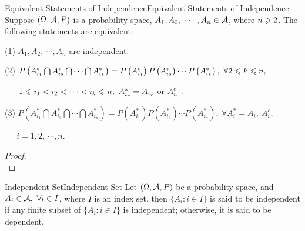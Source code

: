 \documentclass{elegantbook}
\begin{document}
\begin{theorem}{Equivalent Statements of Independence}{Equivalent Statements of Independence}
Suppose $(\Omega,\mathcal{A}, P)$ is a probability space, $A_1,A_2,\ \cdots,A_n\in\mathcal{A}$, where $n\geqslant2$. The following statements are equivalent:

(1) $A_1,A_2,\ \cdots,A_n$ are independent.

(2) $P\left(A_{i_1}^*\bigcap A_{i_2}^*\bigcap\cdots\bigcap A_{i_k}^*\right)=P\left(A_{i_1}^*\right) P\left(A_{i_2}^* \right)\cdots P\left(A_{i_k}^* \right),\ \forall 2\leqslant k\leqslant n,$

$\quad\ \ 1\leqslant i_1<i_2<\cdots <i_k\leqslant n,\ A_{i_r}^*=A_{i_r}$ or $A_{i_r}^c$ .
       
(3) $P\left(A_{i_1}^*\bigcap A_{i_2}^*\bigcap\cdots\bigcap A_{i_n}^*\right)=P\left(A_{i_1}^* \right)P\left(A_{i_2}^* \right)\cdots P\left(A_{i_n}^* \right),\ \forall A_i^*=A_i,\ A_i^c,$

$\quad\ \  i=1,2,\ \cdots,n$.

\end{theorem}

\begin{proof}
\\[4cm]\vspace{0.01cm}
\end{proof}

\begin{definition}{Independent Set}{Independent Set}
Let $(\Omega,\mathcal{A}, P)$ be a probability space, and $A_i\in\mathcal{A},\ \forall i\in I$, where $I$ is an index set, then $\{A_i: i\in I\}$ is said to be independent if any finite subset of $\{A_i: i\in I\}$ is independent; otherwise, it is said to be dependent.
\end{definition}
\end{document}
